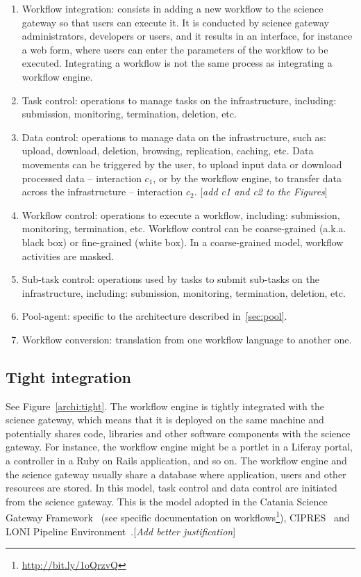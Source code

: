 \documentclass[preprint,3p,twocolumn]{elsarticle}
\newcommand{\todo}[1]{\color{blue}\xspace[\emph{#1}]\xspace\color{black}}
\begin{document}
\begin{enumerate}[leftmargin=0cm,itemindent=0.6cm,label=\texttt{(\alph*)}]

\item Workflow integration: consists in adding a new workflow to the
  science gateway so that users can execute it. It is conducted by
  science gateway administrators, developers or users, and it results
  in an interface, for instance a web form, where users can enter the
  parameters of the workflow to be executed. Integrating a workflow is
  not the same process as integrating a workflow engine.
\item Task control: operations to manage tasks on the infrastructure,
  including: submission, monitoring, termination, deletion, etc.
\item Data control: operations to manage data on
  the infrastructure, such as: upload, download, deletion, browsing,
  replication, caching, etc. Data movements can be triggered by the
  user, to upload input data or download processed data -- interaction
  \texttt{$c_1$}, or by the workflow engine, to transfer data across the
  infrastructure -- interaction \texttt{$c_2$}. \todo{add c1 and c2 to the
    Figures}
\item Workflow control: operations to execute a workflow, including:
  submission, monitoring, termination, etc. Workflow control can be
  coarse-grained (a.k.a. black box) or fine-grained (white box). In a
  coarse-grained model, workflow activities are masked. 
\item Sub-task control: operations used by tasks to submit sub-tasks
  on the infrastructure, including: submission, monitoring,
  termination, deletion, etc.
\item Pool-agent: specific to the architecture described in~\ref{sec:pool}.
\item Workflow conversion: translation from one workflow language to
  another one.
\end{enumerate}

\subsection{Tight integration}

See Figure~\ref{archi:tight}. The workflow engine is tightly
integrated with the science gateway, which means that it is deployed
on the same machine and potentially shares code, libraries and other
software components with the science gateway. For instance, the
workflow engine might be a portlet in a Liferay portal, a controller
in a Ruby on Rails application, and so on. The workflow engine and the
science gateway usually share a database where application, users and
other resources are stored. In this model, task control and data
control are initiated from the science gateway. This is the model
adopted in the Catania Science Gateway Framework~\cite{Ardizzone2012}
(see specific documentation on
workflows\footnote{\url{http://bit.ly/1oQrzvQ}}),
CIPRES~\cite{miller2010creating} and LONI Pipeline
Environment~\cite{dinov2009efficient}.\todo{Add better justification}
\end{document}
